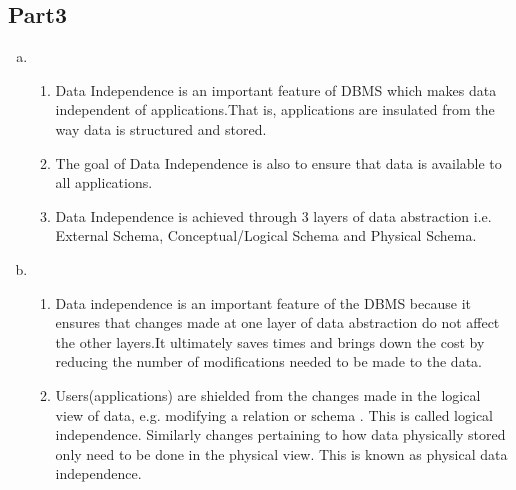 \documentclass[10pt]{article}
\begin{document}
		\subsection*{Part3}
		\begin{enumerate}[(a)]
		    \item
			    \begin{enumerate}[(1)]
			        \item Data Independence is an important feature of DBMS which makes data independent of 		 				       applications.That is, applications are insulated from the way data is structured and stored.
			        \item The goal of Data Independence is also to ensure that data is available to all applications.
			        \item Data Independence is achieved through 3 layers of data abstraction i.e. External Schema, 						     Conceptual/Logical Schema and Physical Schema.
			    \end{enumerate}
		    
		    \item 
			    \begin{enumerate}[(1)]
			        \item Data independence is an important feature of the DBMS because it ensures that changes made at one 					layer of data abstraction do not affect the other layers.It ultimately saves times and brings 					down the cost by reducing the number of modifications needed to be made to the data.
			        \item Users(applications) are shielded from the changes made in the logical view of data, e.g. 							modifying a relation or schema . This is called logical independence. Similarly changes 	                                           pertaining to how data physically stored only need to be done in the physical view. This is                                             known as physical data independence.
			    \end{enumerate}
		    

\end{enumerate}
\end{document}
